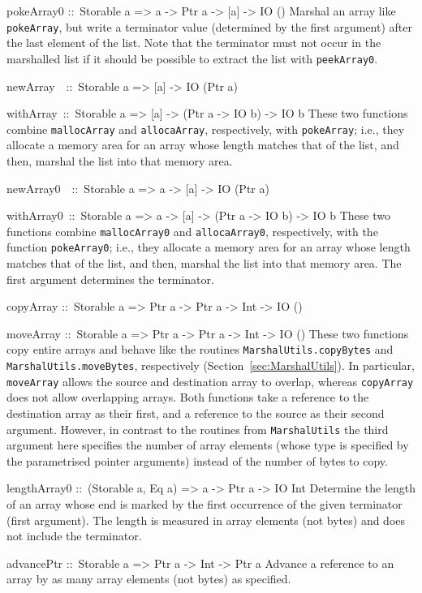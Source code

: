 \documentclass[a4paper,twoside]{article}
\makeatletter
\newcommand{\code}[1]{\texttt{#1}}      %
\newenvironment{codedesc}{%
  \list{}{\labelwidth\z@
    \let\makelabel\codedesclabel}
  }{%
  \endlist
  }
\newcommand*{\codedesclabel}[1]{%
  \hspace{-\leftmargin}
  \parbox[b]{\labelwidth}{\makebox[0pt][l]{\code{#1}}\\}\hfil\relax
  }
\newcommand{\combineitems}{\vspace*{-\itemsep}\vspace*{-\parsep}\vspace*{-1em}}
\makeatother
\begin{document}
\begin{codedesc}
\item[pokeArray0 ::\ Storable a => a -> Ptr a -> {[a]} -> IO ()]
  Marshal an array like \code{pokeArray}, but write a terminator value
  (determined by the first argument) after the last element of the list.  Note
  that the terminator must not occur in the marshalled list if it should be
  possible to extract the list with \code{peekArray0}.

\item[newArray~~::\ Storable a => {[a]} -> IO (Ptr a)]
\item[withArray~::\ Storable a => {[a]} -> (Ptr a -> IO b) -> IO b]\combineitems
  These two functions combine \code{mallocArray} and \code{allocaArray},
  respectively, with \code{pokeArray}; i.e., they allocate a memory area for
  an array whose length matches that of the list, and then, marshal the list
  into that memory area.

\item[newArray0~~::\ Storable a => a -> {[a]} -> IO (Ptr a)]
\item[withArray0~::\ Storable a => a -> {[a]} -> (Ptr a -> IO b) -> IO b]\combineitems
  These two functions combine \code{mallocArray0} and \code{allocaArray0},
  respectively, with the function \code{pokeArray0}; i.e., they allocate a
  memory area for 
  an array whose length matches that of the list, and then, marshal the list
  into that memory area.  The first argument determines the terminator.

\item[copyArray ::\ Storable a => Ptr a -> Ptr a -> Int -> IO ()]
\item[moveArray ::\ Storable a => Ptr a -> Ptr a -> Int -> IO ()]\combineitems
  These two functions copy entire arrays and behave like the routines
  \code{MarshalUtils.copyBytes} and \code{MarshalUtils.moveBytes},
  respectively (Section~\ref{sec:MarshalUtils}).  In particular,
  \code{moveArray} allows the source and destination array to overlap, whereas
  \code{copyArray} does not allow overlapping arrays.  Both functions take a
  reference to the destination array as their first, and a reference to the
  source as their second argument.  However, in contrast to the routines from
  \code{MarshalUtils} the third argument here specifies the number of array
  elements (whose type is specified by the parametrised pointer arguments)
  instead of the number of bytes to copy.
  
\item[lengthArray0 ::\ (Storable a, Eq a) => a -> Ptr a -> IO Int] Determine
  the length of an array whose end is marked by the first occurrence of the
  given terminator (first argument). The length is measured in array elements
  (not bytes) and does not include the terminator.
  
\item[advancePtr ::\ Storable a => Ptr a -> Int -> Ptr a] Advance a reference
  to an array by as many array elements (not bytes) as specified.
\end{codedesc}
\end{document}
